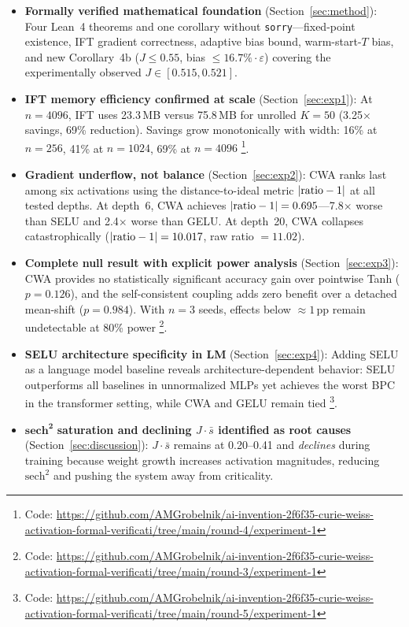 \documentclass[11pt,twocolumn,letterpaper]{article}
\begin{document}
\begin{itemize}
  \item \textbf{Formally verified mathematical foundation} (Section~\ref{sec:method}): Four Lean~4 theorems and one corollary
  without \texttt{sorry}---fixed-point existence, IFT gradient correctness, adaptive bias bound, warm-start-$T$ bias, and
  new Corollary~4b ($J \leq 0.55$, bias $\leq 16.7\%\cdot\varepsilon$) covering the experimentally observed
  $J \in [0.515, 0.521]$.

  \item \textbf{IFT memory efficiency confirmed at scale} (Section~\ref{sec:exp1}): At $n = 4096$, IFT uses 23.3\,MB versus
  75.8\,MB for unrolled $K=50$ (3.25$\times$ savings, 69\% reduction). Savings grow monotonically with width: 16\% at
  $n=256$, 41\% at $n=1024$, 69\% at $n=4096$
  \footnote{Code: \url{https://github.com/AMGrobelnik/ai-invention-2f6f35-curie-weiss-activation-formal-verificati/tree/main/round-4/experiment-1}}.

  \item \textbf{Gradient underflow, not balance} (Section~\ref{sec:exp2}): CWA ranks last among six activations using the
  distance-to-ideal metric $|{\rm ratio}-1|$ at all tested depths. At depth~6, CWA achieves $|{\rm ratio}-1| = 0.695$---7.8$\times$
  worse than SELU and 2.4$\times$ worse than GELU. At depth~20, CWA collapses catastrophically ($|{\rm ratio}-1| = 10.017$,
  raw ratio $= 11.02$).

  \item \textbf{Complete null result with explicit power analysis} (Section~\ref{sec:exp3}): CWA provides no statistically
  significant accuracy gain over pointwise Tanh ($p = 0.126$), and the self-consistent coupling adds zero benefit over a
  detached mean-shift ($p = 0.984$). With $n=3$ seeds, effects below $\approx 1$\,pp remain undetectable at 80\% power
  \footnote{Code: \url{https://github.com/AMGrobelnik/ai-invention-2f6f35-curie-weiss-activation-formal-verificati/tree/main/round-3/experiment-1}}.

  \item \textbf{SELU architecture specificity in LM} (Section~\ref{sec:exp4}): Adding SELU as a language model baseline
  reveals architecture-dependent behavior: SELU outperforms all baselines in unnormalized MLPs yet achieves the worst BPC
  in the transformer setting, while CWA and GELU remain tied
  \footnote{Code: \url{https://github.com/AMGrobelnik/ai-invention-2f6f35-curie-weiss-activation-formal-verificati/tree/main/round-5/experiment-1}}.

  \item \texorpdfstring{$\mathbf{\text{sech}^2}$}{\textbf{sech\texttwosuperior}} \textbf{saturation and declining
  \texorpdfstring{$J\cdot\bar{s}$}{J.s-bar} identified as root causes} (Section~\ref{sec:discussion}): $J\cdot\bar{s}$
  remains at 0.20--0.41 and \emph{declines} during training because weight growth increases activation magnitudes, reducing
  $\text{sech}^2$ and pushing the system away from criticality.
\end{itemize}
\end{document}
